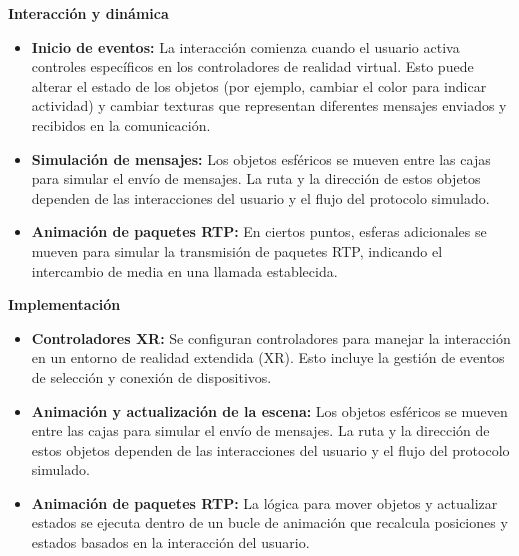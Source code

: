 \documentclass[a4paper, 12pt]{book}
\begin{document}
\textbf{Interacción y dinámica}

\begin{itemize}
  \item \textbf{Inicio de eventos:} La interacción comienza cuando el usuario activa controles específicos en los controladores de realidad virtual. 
  Esto puede alterar el estado de los objetos (por ejemplo, cambiar el color para indicar actividad) y cambiar texturas que 
  representan diferentes mensajes enviados y recibidos en la comunicación.
  
  \item \textbf{Simulación de mensajes:} Los objetos esféricos se mueven entre las cajas para simular el envío de mensajes. 
  La ruta y la dirección de estos objetos dependen de las interacciones del usuario y el flujo del protocolo simulado.

  \item \textbf{Animación de paquetes RTP:} En ciertos puntos, esferas adicionales se mueven para simular la transmisión de paquetes RTP, 
  indicando el intercambio de media en una llamada establecida.
  
\end{itemize}


\textbf{Implementación}

\begin{itemize}
  \item \textbf{Controladores XR:} Se configuran controladores para manejar la interacción en un entorno de realidad extendida (XR). 
  Esto incluye la gestión de eventos de selección y conexión de dispositivos.
  
  \item \textbf{Animación y actualización de la escena:} Los objetos esféricos se mueven entre las cajas para simular el envío de mensajes. 
  La ruta y la dirección de estos objetos dependen de las interacciones del usuario y el flujo del protocolo simulado.

  \item \textbf{Animación de paquetes RTP:} La lógica para mover objetos y actualizar estados se ejecuta dentro de un bucle 
  de animación que recalcula posiciones y estados basados en la interacción del usuario.
  
\end{itemize}
\end{document}
